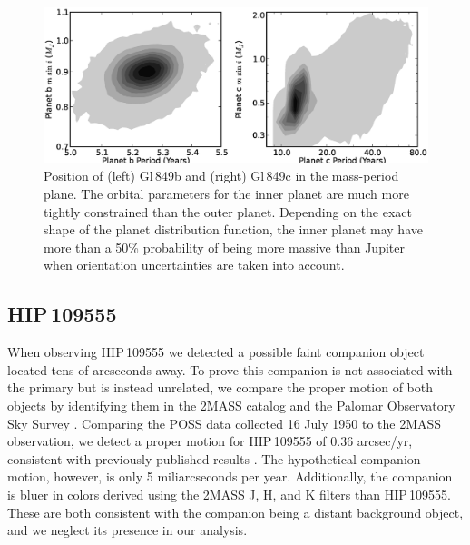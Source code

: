 \begin{figure}[htbp]
\centerline{\includegraphics[width=1.0\textwidth]{chapter3/f16.eps}}
\caption[Posterior distributions of allowed masses and periods of 
Gl\,849\,b and Gl\,849\,c]{Position of (left) Gl\,849b and (right) Gl\,849c in the mass-period plane. The orbital parameters for the inner planet are much more tightly constrained than the outer planet. Depending on the exact shape of the planet distribution function, the inner planet may have more than a 50\% probability of being more massive than Jupiter when orientation uncertainties are taken into account.
  }
\label{849}
\end{figure}



\subsection{HIP\,109555}
When observing HIP\,109555 we detected a possible faint companion object located tens of arcseconds away. To prove this companion is not associated with the primary but is instead unrelated, we compare the proper motion of both objects by identifying them in the 2MASS catalog \citep{Skrutskie06} and the Palomar Observatory Sky Survey \citep{Abell59}. Comparing the POSS data collected 16 July 1950 to the 2MASS observation, we detect a proper motion for HIP\,109555 of 0.36 arcsec/yr, consistent with previously published results \citep{vanLeeuwen07}. The hypothetical companion motion, however, is only 5 miliarcseconds per year. Additionally, the companion is bluer in colors derived using the 2MASS J, H, and K filters than HIP\,109555. These are both consistent with the companion being a distant background object, and we neglect its presence in our analysis.

